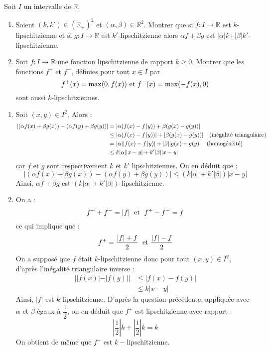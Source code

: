 \documentclass[a4paper,10pt]{report}
\begin{document}
\begin{Exercice}{} Soit $I$ un intervalle de $\mathbb{R}$.

\begin{enumerate}
\item Soient $(k,k') \in (\mathbb{R}_+)^2$ et $(\alpha, \beta) \in \mathbb{R}^2$. Montrer que si $f : I \rightarrow \mathbb{R}$ est $k$-lipschitzienne et si $g : I \rightarrow \mathbb{R}$ est $k'$-lipschitzienne alors $\alpha f+ \beta g$ est $\vert \alpha \vert k  + \vert \beta \vert k'$-lipschitzienne.
\item Soit $f : I \rightarrow \mathbb{R}$ une fonction lipschitzienne de rapport $k \geq 0$. Montrer que les fonctions $f^+$ et $f^{-}$, définies pour tout $x \in I$ par 
$$ f^+(x)= \max(0,f(x)) \hbox{ et } f^{-}(x) = \max(-f(x),0) $$
sont aussi $k$-lipschitziennes.
\end{enumerate}
\end{Exercice}

\corr 


\begin{enumerate}
\item Soit $(x,y) \in I^2$. Alors :
\begin{align*}
\vert (\alpha f(x)+ \beta g(x))-(\alpha f(y)+ \beta g(y)) \vert & = \vert \alpha (f(x)-f(y)) + \beta (g(x)-g(y)) \vert \\
& \leq \vert \alpha (f(x)-f(y)) \vert + \vert \beta (g(x)-g(y)) \vert \quad \hbox{(inégalité triangulaire)} \\
& = \vert \alpha \vert \vert f(x)-f(y) \vert + \vert \beta \vert \vert g(x)-g(y) \vert \quad \hbox{(homogénéité)} \\
& \leq k \vert \alpha \vert  \vert x-y \vert + k' \vert \beta \vert \vert x-y \vert 
\end{align*}
car $f$ et $g$ sont respectivement $k$ et $k'$ lipschitziennes. On en déduit que :
$$ \vert (\alpha f(x)+ \beta g(x))-(\alpha f(y)+ \beta g(y)) \vert \leq (k \vert \alpha \vert + k' \vert \beta \vert) \vert x-y \vert$$
Ainsi, $\alpha f+ \beta g$ est $(k \vert \alpha \vert + k' \vert \beta \vert)$-lipschitzienne.
\item On a :
$$ f^{+} + f^{-} = \vert f \vert \; \hbox{ et } \; f^{+}-f^{-} = f$$
ce qui implique que :
$$ f^{+} = \dfrac{\vert f \vert+f}{2} \; \hbox{ et } \dfrac{\vert f \vert - f}{2}$$
On a supposé que $f$ était $k$-lipschitzienne donc pour tout $(x,y) \in I^2$, d'après l'inégalité triangulaire \og inverse \fg :
\begin{align*}
\vert \vert f(x) \vert - \vert f(y) \vert \vert & \leq \vert f(x)-f(y) \vert  \\
& \leq k \vert x-y \vert
\end{align*}
Ainsi, $\vert f \vert$ est $k$-lipschitzienne. D'après la question précédente, appliquée avec $\alpha$ et $\beta$ égaux à $\dfrac{1}{2}$, on en déduit que $f^{+}$ est lipschitzienne avec rapport :
$$ \left\vert \dfrac{1}{2} \right\vert k + \left\vert \dfrac{1}{2} \right\vert k = k$$
On obtient de même que $f^{-}$ est $k-$lipschitzienne.
\end{enumerate}
\end{document}
